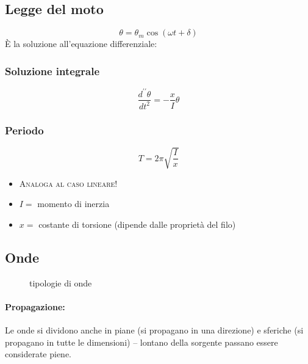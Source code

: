 \documentclass{book}
\begin{document}
\subsection{Legge del moto}
\label{sec:leggedelmotopenditors}

\begin{equation}
  \label{eq:leggedelmotopenditors}
  \theta=\theta_m\cos(\omega t+\delta)
\end{equation}
È la soluzione all'equazione differenziale:

\begin{multicols}{2}
  \subsubsection{Soluzione integrale}
  \label{sec:leggedelmotopendditorsintegral}
  \begin{equation}
    \label{eq:leggedelmotopendditorsintegral}
    \frac{d^{\prime\prime}\theta}{dt^2}=-\frac{x}{I}\theta
  \end{equation}
  \subsubsection{Periodo}
  \label{sec:periodoleggedelmotopendditorsione}
  \begin{equation}
    \label{eq:periodoleggedelmotopendditorsione}
    T=2\pi\sqrt{\frac{I}{x}}
  \end{equation}
\end{multicols}
\begin{itemize}
\item \textsc{Analoga al caso lineare!}
\item $I=$ momento di inerzia
\item $x=$ costante di torsione {\color{red}(dipende dalle proprietà del filo)}
\end{itemize}

\subsection{Onde}
\label{sec:onde}
\begin{figure}[ht!]
  \centering
  
  \caption{tipologie di onde}
  \label{fig:tiponde}
\end{figure}

\paragraph{Propagazione:}
Le onde si dividono anche in piane (si propagano in una direzione) e sferiche (si propagano in tutte le dimensioni) -- lontano della sorgente passano essere considerate piene.
\end{document}
